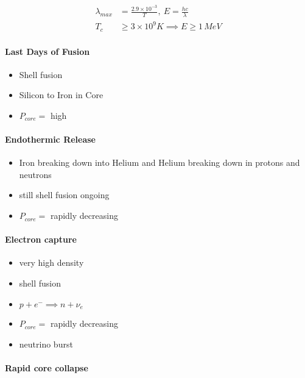 \documentclass[a4paper,11pt,normalem]{article}
\begin{document}
\[
    \begin{aligned}
    \lambda_{max} &= \frac{2.9\times10^{-3}}{T}, ~ E = \frac{hc}{\lambda} \\
    T_c &\geq 3\times10^9 K \implies E \geq 1\,MeV
    \end{aligned}
\]

\paragraph{Last Days of Fusion}\label{last-days-of-fusion}

\begin{itemize}
\item
  Shell fusion
\item
  Silicon to Iron in Core
\item
  \(P_{core} =\) high
\end{itemize}

\paragraph{Endothermic Release}\label{endothermic-release}

\begin{itemize}
\item
  Iron breaking down into Helium and Helium breaking down in protons and
  neutrons
\item
  still shell fusion ongoing
\item
  \(P_{core} =\) rapidly decreasing
\end{itemize}

\paragraph{Electron capture}\label{electron-capture}

\begin{itemize}
\item
  very high density
\item
  shell fusion
\item
  \(p + e^- \implies n + \nu_e\)
\item
  \(P_{core} =\) rapidly decreasing
\item
  neutrino burst
\end{itemize}

\paragraph{Rapid core collapse}\label{rapid-core-collapse}
\end{document}
